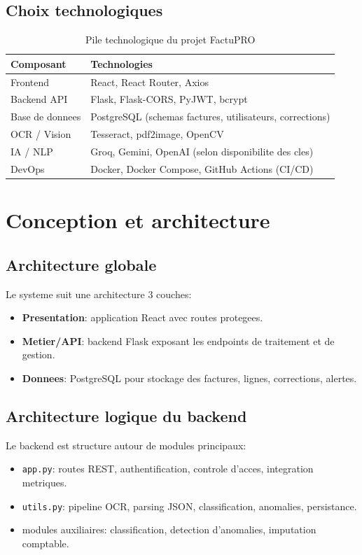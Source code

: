 \documentclass[12pt,a4paper]{report}
\begin{document}
\section{Choix technologiques}
\begin{table}[H]
    \centering
    \begin{tabular}{p{4cm}p{9cm}}
        \toprule
        \textbf{Composant} & \textbf{Technologies} \\
        \midrule
        Frontend & React, React Router, Axios \\
        Backend API & Flask, Flask-CORS, PyJWT, bcrypt \\
        Base de donnees & PostgreSQL (schemas factures, utilisateurs, corrections) \\
        OCR / Vision & Tesseract, pdf2image, OpenCV \\
        IA / NLP & Groq, Gemini, OpenAI (selon disponibilite des cles) \\
        DevOps & Docker, Docker Compose, GitHub Actions (CI/CD) \\
        \bottomrule
    \end{tabular}
    \caption{Pile technologique du projet FactuPRO}
\end{table}

\chapter{Conception et architecture}
\section{Architecture globale}
Le systeme suit une architecture 3 couches:
\begin{itemize}
    \item \textbf{Presentation}: application React avec routes protegees.
    \item \textbf{Metier/API}: backend Flask exposant les endpoints de traitement et de gestion.
    \item \textbf{Donnees}: PostgreSQL pour stockage des factures, lignes, corrections, alertes.
\end{itemize}

\section{Architecture logique du backend}
Le backend est structure autour de modules principaux:
\begin{itemize}
    \item \texttt{app.py}: routes REST, authentification, controle d'acces, integration metriques.
    \item \texttt{utils.py}: pipeline OCR, parsing JSON, classification, anomalies, persistance.
    \item modules auxiliaires: classification, detection d'anomalies, imputation comptable.
\end{itemize}
\end{document}

